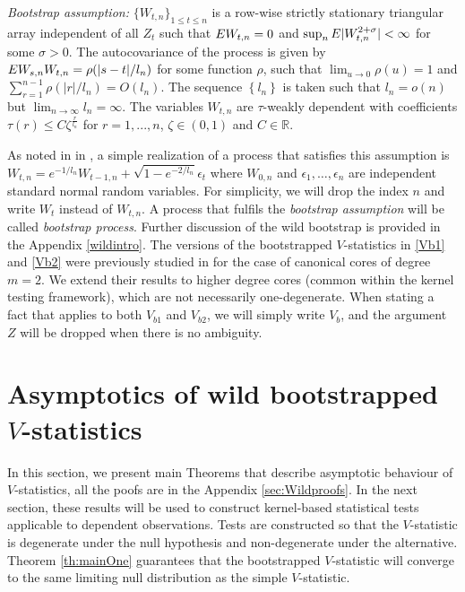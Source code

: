 \emph{Bootstrap assumption:} $\{W_{t,n}\}_{1 \leq t \leq n }$ is a row-wise strictly stationary triangular array independent of all $Z_t$ such that $E W_{t,n}=0$ and $\sup_{n} E|W_{t,n}^{2+\sigma}| < \infty$ for some $\sigma > 0$. The autocovariance of the process is given by $E W_{s,n} W_{t,n}=\rho(|s-t|/l_n)$ for some function $\rho$, such that $\lim_{u \to 0} \rho(u) = 1$ and $\sum_{r=1}^{n-1} \rho(|r|/l_n)= O(l_n)$. The sequence $\left\{l_n\right\}$ is taken such that $l_n=o(n)$ but $\lim_{n \to \infty} l_n = \infty$. The variables $W_{t,n}$  are $\tau$-weakly dependent with coefficients $\tau(r) \leq C \zeta^{\frac{r} {l_n}}$ for $r=1,...,n$, $\zeta \in (0,1)$ and $C\in\mathbb R$.

As noted in in \cite[Remark 2]{leucht_dependent_2013}, a simple realization of a process that satisfies this assumption is $W_{t,n} = e^{-1/l_n}W_{t-1,n} + \sqrt{1 -e^{-2/l_n}} \epsilon_t$
where $W_{0,n}$ and $\epsilon_1,\ldots,\epsilon_n$ are independent standard normal random variables. For simplicity, we will drop the index $n$ and write $W_t$ instead of $W_{t,n}$. A process that fulfils the \emph{bootstrap assumption} will be called  \emph{bootstrap process}. Further discussion of the wild bootstrap is provided in the Appendix  \ref{wildintro}.
The versions of the bootstrapped $V$-statistics in \eqref{Vb1} and \eqref{Vb2} were previously studied in \cite{leucht_dependent_2013} for the case of canonical cores of degree $m=2$. We extend their results to higher degree cores (common within the kernel testing framework), which are not necessarily one-degenerate. When stating a fact that applies to both $V_{b1}$ and $V_{b2}$, we will simply write $V_b$, and the argument $Z$ will be dropped when there is no ambiguity. 
\section{Asymptotics of wild bootstrapped $V$-statistics}\label{sec:main}
In this section, we present main Theorems that describe asymptotic behaviour of $V$-statistics, all the poofs are in the Appendix \ref{sec:Wildproofs}.  In the next section, these results will be used to construct kernel-based statistical tests applicable to dependent observations. Tests are constructed so that the  $V$-statistic is degenerate under the null hypothesis and non-degenerate under the alternative. Theorem \ref{th:mainOne} guarantees that the bootstrapped $V$-statistic will converge to the same limiting null distribution as the simple $V$-statistic. 

